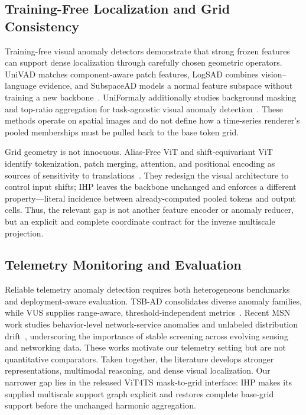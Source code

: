 \subsection{Training-Free Localization and Grid Consistency}
Training-free visual anomaly detectors demonstrate that strong frozen features
can support dense localization through carefully chosen geometric operators.
UniVAD matches component-aware patch features, LogSAD combines vision--language
evidence, and SubspaceAD models a normal feature subspace without training a new
backbone~\cite{gu2025univad,zhang2025logsad,lendering2026subspacead}.
UniFormaly additionally studies background masking and top-ratio aggregation
for task-agnostic visual anomaly detection~\cite{lee2026uniformaly}.  These
methods operate on spatial images and do not define how a time-series renderer's
pooled memberships must be pulled back to the base token grid.

Grid geometry is not innocuous.  Alias-Free ViT and shift-equivariant ViT
identify tokenization, patch merging, attention, and positional encoding as
sources of sensitivity to translations~\cite{michaeli2025aliasfreevit,rojasgomez2024shiftvit}.
They redesign the visual architecture to control input shifts; IHP leaves the
backbone unchanged and enforces a different property---literal incidence
between already-computed pooled tokens and output cells.  Thus, the relevant
gap is not another feature encoder or anomaly reducer, but an explicit and
complete coordinate contract for the inverse multiscale projection.

\subsection{Telemetry Monitoring and Evaluation}
Reliable telemetry anomaly detection requires both heterogeneous benchmarks
and deployment-aware evaluation.  TSB-AD consolidates diverse anomaly families,
while VUS supplies range-aware, threshold-independent metrics~\cite{liu2024elephant,paparrizos2022vus}.
Recent MSN work studies behavior-level network-service anomalies and unlabeled
distribution drift~\cite{dong2025blade,tan2025generative}, underscoring the
importance of stable screening across evolving sensing and networking data.
These works motivate our telemetry setting but are not quantitative comparators.
Taken together, the literature develops stronger representations, multimodal
reasoning, and dense visual localization.  Our narrower gap lies in the
released ViT4TS mask-to-grid interface: IHP makes its supplied multiscale
support graph explicit and restores complete base-grid support before the
unchanged harmonic aggregation.
